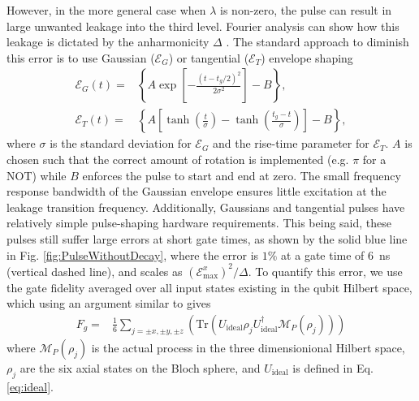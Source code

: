 \documentclass[prl,twocolumn,aps,final,floatfix,superscriptaddress,showpacs]{revtex4}
\newcommand{\dg}{^\dagger}
\newcommand{\red}{\color[rgb]{0.8,0,0}}
\begin{document}
However, in the more general case when $\lambda$ is non-zero, the pulse can result in large unwanted leakage into the third level.  Fourier analysis can show how this leakage is dictated by the anharmonicity $\Delta$ \cite{Warren:1984a,Steffen:2003a}. The standard approach to diminish this error is to use Gaussian ($\mathcal{E}_G$) \cite{Bauer:1984a} or tangential ($\mathcal{E}_T$) envelope shaping
\begin{equation}\label{eq:gaussian}
\begin{split}
	\mathcal{E}_G(t)=& \left\{A\exp\left[-\frac{(t - t_g/2)^2}{2\sigma^2}\right]-B\right\},\\
	\mathcal{E}_T(t)=& \left\{A\left[\tanh\left(\frac{t}{\sigma}\right)-\tanh\left(\frac{t_g-t}{\sigma}\right)\right]-B\right\},
\end{split}
\end{equation}
where $\sigma$ is the standard deviation for $\mathcal{E}_G$ and the rise-time parameter for $\mathcal{E}_T$. $A$ is chosen such that the correct amount of rotation is implemented (e.g. $\pi$ for a NOT) while $B$ enforces the pulse to start and end at zero. The small frequency response bandwidth of the Gaussian envelope ensures little excitation at the leakage transition frequency. Additionally, Gaussians and tangential pulses have relatively simple pulse-shaping hardware requirements. This being said, these pulses still suffer large errors at short gate times, as shown by the solid blue line in Fig. \ref{fig:PulseWithoutDecay}, where the error is $1\%$ at a gate time of $6$~ns (vertical dashed line),  and scales as $(\mathcal{E}^x_\mathrm{max})^2/\Delta$.  To quantify this error, we use the gate fidelity averaged over all input states existing in the qubit Hilbert space, which using an argument similar to \cite{Bowdrey:2002a} gives 
\begin{equation}
	\begin{split}\label{eq:fid}	
		F_g	=&\frac{1}{6}\sum_{j=\pm x, \pm y, \pm z}\left(\mathrm{Tr}(U_\mathrm{ideal} \rho_j U_\mathrm{ideal}\dg \mathcal{M}_P(\rho_j))\right)
	\end{split}
\end{equation} 
where $\mathcal{M}_P(\rho_j)$ is the actual process in the three dimensionional Hilbert space, $\rho_j$ are the six axial states on the Bloch sphere, and $U_\mathrm{ideal}$ is defined in Eq. \eqref{eq:ideal}.

 
\end{document}
